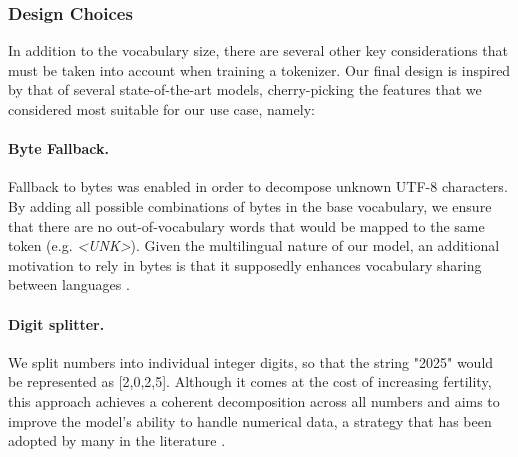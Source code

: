 \subsubsection{Design Choices}
In addition to the vocabulary size, there are several other key considerations that must be taken into account when training a tokenizer. Our final design is inspired by that of several state-of-the-art models,  cherry-picking the features that we considered most suitable for our use case, namely:


\paragraph{Byte Fallback.} Fallback to bytes was enabled in order to decompose unknown UTF-8 characters. By adding all possible combinations of bytes in the base vocabulary, we ensure that there are no out-of-vocabulary words that would be mapped to the same token (e.g. \textit{<UNK>}). Given the multilingual nature of our model, an additional motivation to rely in bytes is that it supposedly enhances vocabulary sharing between languages \cite{bbpe}.

\paragraph{Digit splitter.} We split numbers into individual integer digits, so that the string "2025" would be represented as [2,0,2,5]. Although it comes at the cost of increasing fertility, this approach achieves a coherent decomposition across all numbers and aims to improve the model's ability to handle numerical data, a strategy that has been adopted by many in the literature \cite{palm,llama1,llama2,gemma,gemma2}. 

